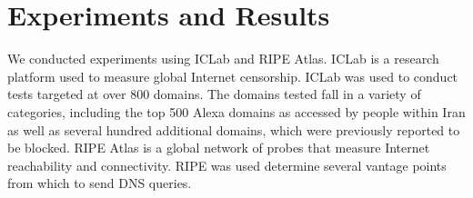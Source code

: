 \section{Experiments and Results}\label{sec:experimentsandresults}
We conducted experiments using ICLab and RIPE Atlas. ICLab is a research platform used to measure global Internet censorship. ICLab was used to conduct tests targeted at over 800 domains. The domains tested fall in a variety of categories, including the  top 500 Alexa domains as accessed by people within Iran as well as several hundred additional domains, which were previously reported to be blocked. RIPE Atlas is a global network of probes that measure Internet reachability and connectivity.  RIPE was used determine several vantage points from which to send DNS queries. 


